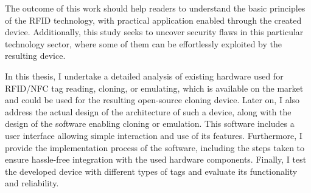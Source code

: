 The outcome of this work should help readers to understand the basic principles of the RFID technology, with practical application enabled through the created device. Additionally, this study seeks to uncover security flaws in this particular technology sector, where some of them can be effortlessly exploited by the resulting device.

In this thesis, I undertake a detailed analysis of existing hardware used for RFID/NFC tag reading, cloning, or emulating, which is available on the market and could be used for the resulting open-source cloning device. Later on, I also address the actual design of the architecture of such a device, along with the design of the software enabling cloning or emulation. This software includes a user interface allowing simple interaction and use of its features. Furthermore, I provide the implementation process of the software, including the steps taken to ensure hassle-free integration with the used hardware components. Finally, I test the developed device with different types of tags and evaluate its functionality and reliability.
